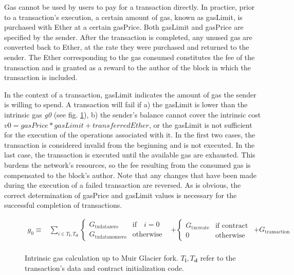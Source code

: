 Gas cannot be used by users to pay for a transaction directly. In practice, prior to a transaction’s execution, a certain amount of gas, known as gasLimit, is purchased with Ether at a certain gasPrice. Both gasLimit and gasPrice are specified by the sender. After the transaction is completed, any unused gas are converted back to Ether, at the rate they were purchased and returned to the sender. The Ether corresponding to the gas consumed constitutes the fee of the transaction and is granted as a reward to the author of the block in which the transaction is included. 

In the context of a transaction, gasLimit indicates the amount of gas the sender is willing to spend. A transaction will fail if a) the gasLimit is lower than the intrinsic gas \textit{g0} (see fig. \ref{fig:intrinsic_cost}), b) the sender's balance cannot cover the intrinsic cost \(v0 = gasPrice * gasLimit + transferredEther\), or the gasLimit is not sufficient for the execution of the operations associated with it. In the first two cases, the transaction is considered invalid from the beginning and is not executed. In the last case, the transaction is executed until the available gas are exhausted. This burdens the network's resources, so the fee resulting from the consumed gas is compensated to the block's author. Note that any changes that have been made during the execution of a failed transaction are reversed. As is obvious, the correct determination of gasPrice and gasLimit values is necessary for the successful completion of transactions.

\begin{figure}[h!]
\begin{small}
\setlength{\mathindent}{0pt}
\begin{align}
g_0 \equiv {} & \sum_{i \in T_{\mathbf{i}}, T_{\mathbf{d}}} \begin{cases} {G_{\mathrm{txdatazero}}} & \text{if} \quad i = 0 \\ {G_{\mathrm{txdatanonzero}}} & \text{otherwise} \end{cases}
\nonumber {} & + \begin{cases} {G_{\mathrm{txcreate}}} & \text{if contract creation} \\ 0 & \text{otherwise} \end{cases}
\nonumber {} & + {G_{\mathrm{transaction}}} \\
\nonumber
\end{align}
\end{small}
\caption{Intrinsic gas calculation up to Muir Glacier fork. $T_{\mathbf{i}},T_{\mathbf{d}}$ refer to the transaction's data and contract initialization code.}
\label{fig:intrinsic_cost}
\end{figure}

